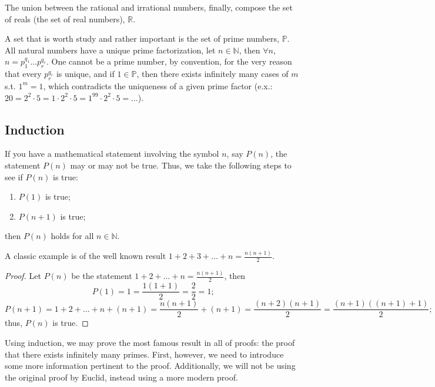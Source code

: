 \documentclass{article}
\begin{document}
The union between the rational and irrational numbers, finally, compose the set of reals (the set of real numbers), \( \mathbb{R} \). 

A set that is worth study and rather important is the set of prime numbers, \( \mathbb{P} \). All natural numbers have a unique prime factorization, let \( n\in \mathbb{N} \), then \( \forall n \), \( n=p_{1}^{q_{1}}\ldots p_{r}^{q_{r}} \). One cannot be a prime number, by convention, for the very reason that every \( p_{r}^{q_{r}} \) is unique, and if \( 1 \in \mathbb{P} \), then there exists infinitely many cases of $m$ s.t. \( 1^m=1 \), which contradicts the uniqueness of a given prime factor (e.x.: \( 20=2^2\cdot 5=1\cdot 2^2\cdot 5=1^{99}\cdot 2^2\cdot 5=\ldots  \)). 

\subsection{Induction}

If you have a mathematical statement involving the symbol \( n \), say \( P(n) \), the statement \( P(n) \) may or may not be true. Thus, we take the following steps to see if \( P(n) \) is true:
\begin{enumerate}
  \item \( P(1) \) is true;
    
    \item \( P(n+1) \) is true;
\end{enumerate}

then \(  P(n) \) holds for all \( n\in \mathbb{N} \). 

A classic example is of the well known result \( 1+2+3+\ldots +n = \frac{n(n+1)}{2} \). 

\begin{proof}
  Let \( P(n)\) be the statement \(1+2+\ldots+n=\frac{n(n+1)}{2} \), then
  \begin{displaymath}
    P(1)= 1 = \frac{1(1+1)}{2}=\frac{2}{2}=1\text{;}
  \end{displaymath}
  \begin{displaymath}
    P(n+1) = 1+2+\ldots +n+(n+1)=\frac{n(n+1)}{2}+(n+1)=\frac{(n+2)(n+1)}{2}=\frac{(n+1)((n+1)+1)}{2}\text{;}
  \end{displaymath}
  thus, \( P(n) \) is true. 
\end{proof}

Using induction, we may prove the most famous result in all of proofs: the proof that there exists infinitely many primes. First, however, we need to introduce some more information pertinent to the proof. Additionally, we will not be using the original proof by Euclid, instead using a more modern proof. 
\end{document}
